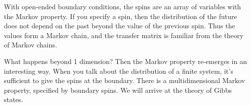 With open-ended boundary conditions, the spins are an array of variables with the Markov property. If you specify a spin, then the distribution of the future does not depend on the past beyond the value of the previous spin. Thus the values form a Markov chain, and the transfer matrix is familiar from the theory of Markov chains. 

What happens beyond 1 dimension? Then the Markov property re-emerges in an interesting way. When you talk about the distribution of a finite system, it's sufficient to give the spins at the boundary. 
There is a multidimensional Markov property, specified by boundary spins. %
We will arrive at the theory of Gibbs states.